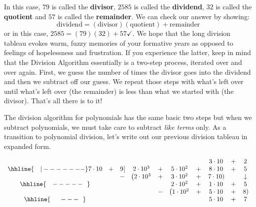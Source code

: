 \setlength\arraycolsep{5pt}
\setlength\extrarowheight{0pt}

In this case, $79$ is called the \textbf{divisor}, $2585$ is called the \textbf{dividend}, $32$ is called the \textbf{quotient} and $57$ is called the \textbf{remainder}.  We can check our answer by showing:  \[ \text{dividend} = (\text{divisor})( \text{quotient}) + \text{remainder}\] or in this case, $2585 = 
 (79)(32) + 57 \checkmark$.  We hope that the long division tableau evokes warm, fuzzy memories of your formative years as opposed to feelings of hopelessness and frustration.  If you experience the latter, keep in mind that the Division Algorithm essentially is a two-step process, iterated over and over again.  First, we guess the number of times the divisor goes into the dividend and  then we subtract off our guess.  We repeat those steps with what's left over until what's left over (the remainder) is less than what we started with (the divisor).  That's all there is to it!

\smallskip

The division algorithm for polynomials has the same basic two steps but when we subtract polynomials, we must take care to subtract \emph{like terms} only.  As a transition to polynomial division, let's write out our previous division tableau in expanded form.


\setlength\arraycolsep{0.1pt}
\setlength\extrarowheight{2pt}

\[ \begin{array}{cccccccccc}

& & & & & & & 3 \cdot 10 & + & 2 \\ \hhline{~~~|-------}

7 \cdot 10 & + & 9 \, \vline& 2\cdot 10^3 & + & 5 \cdot 10^2 & + & 8 \cdot 10 & + & 5 \\

 &  &  -& \left(2 \cdot 10^3 \right. & + &  3 \cdot 10^2  & + & \left. 7 \cdot 10 \right) &  &  \downarrow \\ \hhline{~~~-----~~} 
 &  &  &   &  & 2 \cdot 10^2 & +  & 1 \cdot 10 & + & 5 \\ 
 &  &  &   & - & \left(1 \cdot 10^2 \right. & +  &  5 \cdot 10 &  + &\left.  8 \right) \\ \hhline{~~~~~---~~} 
 &  &  &   &   &  & & 5 \cdot 10  & + & 7 \\

 
\end{array}\]

\setlength\arraycolsep{5pt}
\setlength\extrarowheight{0pt}

